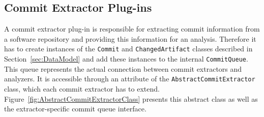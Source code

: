 \subsection{Commit Extractor Plug-ins}
\label{sec:CommitExtractorPlugins}
A commit extractor plug-in is responsible for extracting commit information from a software repository and providing this information for an analysis. Therefore it has to create instances of the \texttt{Commit} and \texttt{ChangedArtifact} classes described in Section~\ref{sec:DataModel} and add these instances to the internal \texttt{CommitQueue}. This queue represents the actual connection between commit extractors and analyzers. It is accessible through an attribute of the \texttt{AbstractCommitExtractor} class, which each commit extractor has to extend. Figure~\ref{fig:AbstractCommitExtractorClass} presents this abstract class as well as the extractor-specific commit queue interface.

